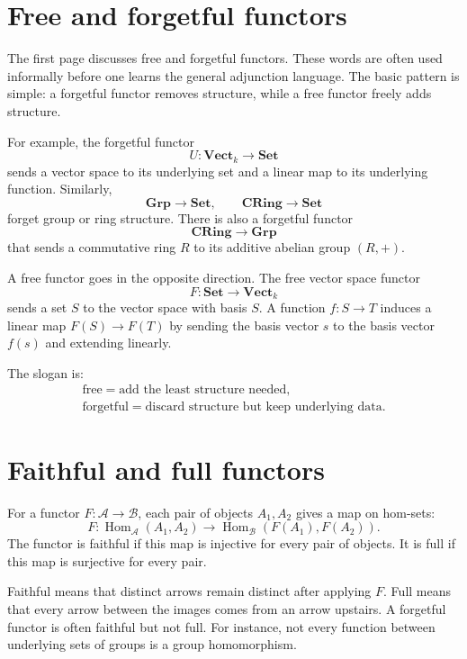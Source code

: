 
\section{Free and forgetful functors}

The first page discusses free and forgetful functors.  These words are often used informally before one learns the general adjunction language.  The basic pattern is simple: a forgetful functor removes structure, while a free functor freely adds structure.

For example, the forgetful functor
\[
  U:\mathbf{Vect}_k\to\mathbf{Set}
\]
sends a vector space to its underlying set and a linear map to its underlying function.  Similarly,
\[
  \mathbf{Grp}\to\mathbf{Set},\qquad
  \mathbf{CRing}\to\mathbf{Set}
\]
forget group or ring structure.  There is also a forgetful functor
\[
  \mathbf{CRing}\to\mathbf{Grp}
\]
that sends a commutative ring $R$ to its additive abelian group $(R,+)$.

A free functor goes in the opposite direction.  The free vector space functor
\[
  F:\mathbf{Set}\to\mathbf{Vect}_k
\]
sends a set $S$ to the vector space with basis $S$.  A function $f:S\to T$ induces a linear map $F(S)\to F(T)$ by sending the basis vector $s$ to the basis vector $f(s)$ and extending linearly.

The slogan is:
\[
\begin{gathered}
  \text{free} = \text{add the least structure needed},\\
  \text{forgetful} = \text{discard structure but keep underlying data}.
\end{gathered}
\]

\section{Faithful and full functors}

For a functor $F:\mathcal A\to\mathcal B$, each pair of objects $A_1,A_2$ gives a map on hom-sets:
\[
  F:\operatorname{Hom}_{\mathcal A}(A_1,A_2)
  \to
  \operatorname{Hom}_{\mathcal B}(F(A_1),F(A_2)).
\]
The functor is faithful if this map is injective for every pair of objects.  It is full if this map is surjective for every pair.

Faithful means that distinct arrows remain distinct after applying $F$.  Full means that every arrow between the images comes from an arrow upstairs.  A forgetful functor is often faithful but not full.  For instance, not every function between underlying sets of groups is a group homomorphism.

